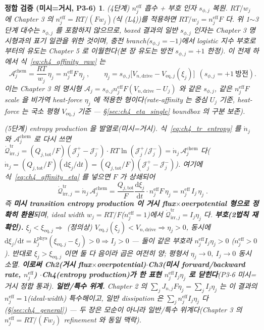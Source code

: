 \documentclass[11pt,a4paper]{article}
\newtheorem*{verifybox}{정합 검증 (미시=거시, P3-6)}
\newcommand{\dd}{\mathrm{d}}
\newcommand{\eff}{\mathrm{eff}}
\newcommand{\eq}{\mathrm{eq}}
\newcommand{\drive}{\mathrm{drive}}
\newcommand{\tot}{\mathrm{tot}}
\newcommand{\irr}{\mathrm{irr}}
\newcommand{\tr}{\mathrm{tr}}
\newcommand{\chem}{\mathrm{chem}}
\begin{document}
\begin{verifybox}
\emph{(4단계) $n_j^{\eff}$ 흡수 + 부호 인자 $s_{\phi,j}$ 복원.} $RT/w_j$ 에 Chapter 3 의
$n_j^{\eff}=RT/(Fw_j)$(식 (L4))를 적용하면 $RT/w_j=n_j^{\eff}F$ 다. \emph{위 1$\sim$3단계 대수는 $s_{\phi,j}$ 를
포함하지 않으므로}, boxed 결과의 일반 $s_{\phi,j}$ 인자는 Chapter 3 명시형과의 \emph{표기 일관}을 위한 것이며,
충전 branch($s_{\phi,j}=-1$)에서 logistic 지수 부호로부터의 \emph{유도}는 Chapter 5 로 이월한다(본 장 유도는 방전
$s_{\phi,j}=+1$ 한정). 이 전제 하에서 식~\eqref{eq:ch4_affinity_raw} 는
\begin{equation}
\boxed{\;\mathcal A_j^{\chem}=\frac{RT}{w_j}\,\eta_j=n_j^{\eff}F\,\eta_j\;,\qquad
\eta_j=s_{\phi,j}\big[V_{n,\drive}-V_{\eq,j}(\xi_j)\big]\ \ (s_{\phi,j}=+1\ \text{방전}).}
\label{eq:ch4_affinity_eta}
\end{equation}
이는 Chapter 3 의 명시형 $\mathcal A_j=s_{\phi,j}n_j^{\eff}F(V_{n,\drive}-U_j)$ 와 \emph{같은 $s_{\phi,j}$,
같은 $n_j^{\eff}F$ scale} 을 비가역 \emph{heat-force} $\eta_j$ 에 적용한 형이다(rate-affinity 는 중심 $U_j$
기준, heat-force 는 국소 평형 $V_{\eq,j}$ 기준 — \S\ref{sec:ch4_eta_single} boundbox 의 구분 보존).

\emph{(5단계) entropy production 을 발열로(미시=거시).} 식~\eqref{eq:ch4_tr_entropy} 를 $\dot n_j$ 와
$\mathcal A_j^{\chem}$ 로 다시 쓰면 $\dot{\mathcal Q}_{\irr,j}^{\tr}=(Q_{j,\tot}/F)(\mathcal J_j^+-\mathcal J_j^-)
\cdot RT\ln(\mathcal J_j^+/\mathcal J_j^-)=\dot n_j\,\mathcal A_j^{\chem}$ 다($\dot n_j=(Q_{j,\tot}/F)(\dd\xi_j/\dd t)
=(Q_{j,\tot}/F)(\mathcal J_j^+-\mathcal J_j^-)$). 여기에 식~\eqref{eq:ch4_affinity_eta} 를 넣으면 $F$ 가 상쇄되어
\begin{equation}
\boxed{\;\dot{\mathcal Q}_{\irr,j}^{\tr}=\dot n_j\,\mathcal A_j^{\chem}
=\frac{Q_{j,\tot}}{F}\frac{\dd\xi_j}{\dd t}\cdot n_j^{\eff}F\,\eta_j
=n_j^{\eff}\,I_j\,\eta_j\;.}
\label{eq:ch4_micro_macro}
\end{equation}
즉 \textbf{미시 transition entropy production 이 거시 flux$\times$overpotential 형으로 정확히 환원}되며, ideal
width $w_j=RT/F$($n_j^{\eff}=1$)에서 $\dot{\mathcal Q}_{\irr,j}^{\tr}=I_j\eta_j$ 다. \textbf{부호(2법칙
재확인).} $\xi_j<\xi_{\eq,j}\Rightarrow$ (정의상) $V_{\eq,j}(\xi_j)<V_{n,\drive}\Rightarrow\eta_j>0$, 동시에
$\dd\xi_j/\dd t=k_j^{\mathrm{phys}}(\xi_{\eq,j}-\xi_j)>0\Rightarrow I_j>0$ — 둘이 같은 부호라 $n_j^{\eff}I_j\eta_j>0$
($n_j^{\eff}>0$). 반대로 $\xi_j>\xi_{\eq,j}$ 이면 둘 다 음이라 곱은 여전히 양; 평형서 $\eta_j\to0,\ I_j\to0$
동시 소멸. \textbf{이로써 Ch2(거시 flux$\times$overpotential)$\cdot$Ch3(미시 forward/backward rate, $n_j^{\eff}$)
$\cdot$Ch4(entropy production)가 한 표현 $n_j^{\eff}I_j\eta_j$ 로 닫힌다}(P3-6 미시=거시 정합 통과).
\textbf{일반/특수 위계.} \emph{Chapter 2 의 $\sum_j J_{n,j}F\eta_j=\sum_j I_j\eta_j$ 는 이 결과의
$n_j^{\eff}=1$(ideal-width) 특수해}이고, 일반 dissipation 은 $\sum_j n_j^{\eff}I_j\eta_j$ 다(\S\ref{sec:ch4_general})
— 두 장은 모순이 아니라 일반/특수 위계다(Chapter 3 의 $n_j^{\eff}=RT/(Fw_j)$ refinement 와 동일 맥락).
\end{verifybox}
\end{document}
